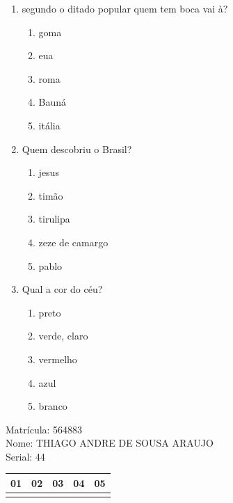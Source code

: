 \documentclass[10pt,a4paper,twocolumn]{report}
\begin{document}
 \begin{enumerate} 
    \item  segundo o ditado popular quem tem boca vai à?





    \begin{enumerate}
    \item  goma

\item  eua

\item  roma

\item  Bauná

\item  itália


    \end{enumerate} 
    \item  Quem descobriu o Brasil?





    \begin{enumerate}
    \item  jesus

\item  timão

\item  tirulipa

\item  zeze de camargo

\item  pablo


    \end{enumerate} 
    \item  Qual a cor do céu?





    \begin{enumerate}
    \item  preto

\item  verde, claro

\item  vermelho

\item  azul

\item  branco


    \end{enumerate}\end{enumerate} 
Matrícula: 564883\\ Nome: THIAGO ANDRE DE SOUSA ARAUJO \\ Serial: 44\\
\begin{tabular}{|l|l|l|l|l|}\hline
01  &02  &03  &04  &05 \\ \hline 
 & & & & \\ \hline 
\end{tabular}
 \cleardoublepage 
\end{document}
